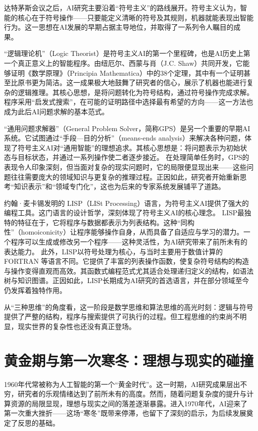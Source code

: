 达特茅斯会议之后，AI研究主要沿着“符号主义”的路线展开。符号主义认为，智能的核心在于符号操作——只要能定义清晰的符号及其规则，机器就能表现出智能行为。这一思想在AI发展的早期占据主导地位，并取得了一系列令人瞩目的成果。

“逻辑理论机”（Logic Theorist）是符号主义AI的第一个里程碑，也是AI历史上第一个真正意义上的智能程序。由纽厄尔、西蒙与肖（J.C. Shaw）共同开发，它能够证明《数学原理》（Principia Mathematica）中的38个定理，其中有一个证明甚至比原书更为简洁。这一成果极大地鼓舞了研究者的信心，展示了机器也能进行复杂的逻辑推理。其核心思想，是将问题转化为符号结构，通过符号操作完成求解。程序采用“启发式搜索”，在可能的证明路径中选择最有希望的方向——这一方法也成为此后AI问题求解的基本范式。

“通用问题求解器”（General Problem Solver，简称GPS）是另一个重要的早期AI系统。它试图通过“手段—目的分析”（means-ends analysis）来解决各种问题，体现了符号主义AI对“通用智能”的理想追求。其核心思想是：将问题表示为初始状态与目标状态，并通过一系列操作使二者逐步接近。  
在处理简单任务时，GPS的表现令人印象深刻，但当面对复杂的现实问题时，它的局限便显现出来——这些问题往往需要庞大的领域知识与更复杂的推理过程。正因如此，研究者开始重新思考“知识表示”和“领域专门化”，这也为后来的专家系统发展铺平了道路。

约翰·麦卡锡发明的 LISP（LISt Processing）语言，为符号主义AI提供了强大的编程工具。这门语言的设计哲学，深刻体现了符号主义AI的核心理念。  
LISP最独特的特征在于，它将程序与数据都表示为列表结构。这种“同构性”（homoiconicity）让程序能够操作自身，从而具备了自适应与学习的潜力。一个程序可以生成或修改另一个程序——这种灵活性，为AI研究带来了前所未有的表达能力。  
此外，LISP以符号处理为核心，与当时主要用于数值计算的 FORTRAN 等语言不同。它提供了丰富的列表操作函数，使复杂符号结构的构造与操作变得直观而高效。其函数式编程范式尤其适合处理递归定义的结构，如语法树与知识图谱。正因如此，LISP长期成为AI研究的首选语言，并在部分领域至今仍发挥着独特作用。

从“三种思维”的角度看，这一阶段是数学思维和算法思维的高光时刻：逻辑与符号提供了严整的结构，程序与搜索提供了可执行的过程。但工程思维的约束尚不明显，现实世界的复杂性也还没有真正登场。

\section{黄金期与第一次寒冬：理想与现实的碰撞}

1960年代常被称为人工智能的第一个“黄金时代”。这一时期，AI研究成果层出不穷，研究者的乐观情绪达到了前所未有的高度。然而，随着问题复杂度的提升与计算资源的局限显现，理想与现实之间的落差逐渐暴露。进入1970年代，AI迎来了第一次重大挫折——这场“寒冬”既带来停滞，也留下了深刻的启示，为后续发展奠定了反思的基础。

